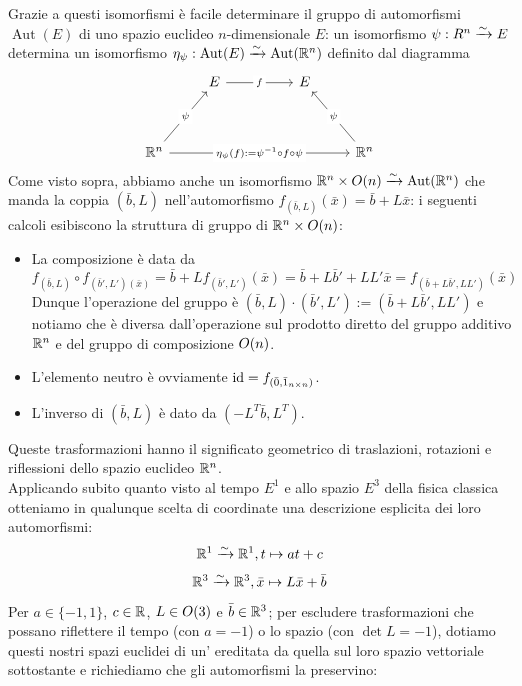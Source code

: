 \documentclass[openany]{book}
\begin{document}
\newcommand\Aut{\operatorname{Aut}}
Grazie a questi isomorfismi è facile determinare il gruppo di automorfismi $\Aut(E)$ di uno spazio euclideo $n$-dimensionale $E$: un isomorfismo $\psi:R^n\xrightarrow{\sim} E$ determina un isomorfismo $\eta_\psi : \Aut(E)\iso\Aut(\R^n)$ definito dal diagramma
\[\begin{tikzcd}
	& E && E & \\
	\\
	{\R^n} &&&& {\R^n}
	\arrow["f"{description}, from=1-2, to=1-4]
	\arrow["\psi"{description}, from=3-1, to=1-2]
	\arrow["{\eta_\psi(f) :=  \psi^{-1} \circ f \circ \psi}"{description}, from=3-1, to=3-5]
	\arrow["\psi"{description}, from=3-5, to=1-4]
\end{tikzcd}\]
Come visto sopra, abbiamo anche un isomorfismo $\R^n\times\\O(n)\iso\Aut(\R^n)$ che manda la coppia $(\bar{b},L)$ nell'automorfismo $f_{(\bar{b},L)}(\bar{x}) = \bar{b}+L\bar{x}$: i seguenti calcoli esibiscono la struttura di gruppo di $\mathbb{R}^n\times\\O(n)$:\begin{itemize}
    \item La composizione è data da
        \[ f_{(\bar{b},L)} \circ f_{(\bar{b}',L')(\bar{x})} = \bar{b} + L f_{(\bar{b}',L')}(\bar{x}) = \bar{b}+L\bar{b}' + LL'\bar{x} = f_{(\bar{b} + L\bar{b}', LL' )}(\bar{x}) \]
        Dunque l'operazione del gruppo è $(\bar{b},L)\cdot (\bar{b}',L') := (\bar{b} + L\bar{b}', LL' )$ e notiamo che è diversa dall'operazione \naif sul prodotto diretto del gruppo additivo $\mathbb{R}^n$ e del gruppo di composizione $\\O(n)$. 
    \item L'elemento neutro è ovviamente $\operatorname{id} = f_{(\bar{0},\bar{1}_{n\times n})}$.
    \item L'inverso di $(\bar{b},L)$ è dato da $(-L^T\bar{b},L^T)$.
\end{itemize}
Queste trasformazioni hanno il significato geometrico di traslazioni, rotazioni e riflessioni dello spazio euclideo $\mathbb{R}^n$.\\
Applicando subito quanto visto al tempo $E^1$ e allo spazio $E^3$ della fisica classica otteniamo in qualunque scelta di coordinate una descrizione esplicita dei loro automorfismi: 
\[ \mathbb{R}^1\xrightarrow{\sim} \mathbb{R}^1, t\mapsto at+c \]
\[ \mathbb{R}^3 \xrightarrow{\sim} \mathbb{R}^3, \bar{x}\mapsto L\bar{x} + \bar{b} \]
Per $a \in \{-1,1\}$, $c \in \mathbb{R}$, $L\in\\O(3)$ e $\bar{b}\in\mathbb{R}^3$; per escludere trasformazioni che possano riflettere il tempo (con $a=-1$) o lo spazio (con $\det L = -1$), dotiamo questi nostri spazi euclidei di un' ereditata da quella sul loro spazio vettoriale sottostante e richiediamo che gli automorfismi la preservino:
\end{document}
